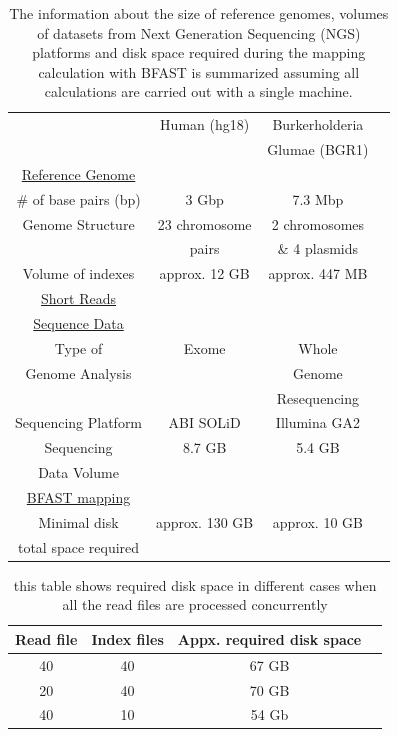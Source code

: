 \documentclass{acm_proc_article-sp}
\begin{document}
\begin{table}
\begin{tabular}{|c|c|c|c|} 
  \hline 
   & Human (hg18) & Burkerholderia   \\ 
& & Glumae (BGR1)\\   
   
   \hline
 \underline{Reference Genome}   \\
    \# of base pairs (bp) &  3 Gbp & 7.3 Mbp \\
   Genome Structure &   23 chromosome  & 2 chromosomes  \\  
   &   pairs & \& 4 plasmids \\
    Volume of indexes  & approx. 12 GB  & approx. 447 MB  \\
      \hline
    \underline{ Short Reads}   \\
        \underline{ Sequence Data}   \\
  Type of  &  Exome  & Whole \\
  
Genome Analysis  &  &  Genome \\
&& Resequencing \\
  Sequencing Platform & ABI SOLiD  &  Illumina GA2 \\
  Sequencing   & 8.7 GB & 5.4 GB \\
  Data Volume&&\\
  
  
  \hline
  \underline{ BFAST mapping}  \\
  Minimal disk &  approx. 130 GB   &    approx. 10 GB   \\
total space required & &\\
\hline
\end{tabular} \caption{The information about the size of reference genomes, volumes of datasets from Next Generation Sequencing (NGS) platforms and disk space required during the mapping calculation with BFAST is summarized assuming all calculations are carried out with a single machine.}
 \label{table:two-genomes} 
\end{table}



\begin{table}
 \begin{tabular}{|c|c|c|c|} 
 \hline 
Read file & Index files & Appx. required disk space \\
 \hline
40 &  40 & 67 GB \\
20 & 40 & 70 GB \\
40 & 10 & 54 Gb \\ 

 \hline
 \end{tabular}
 \label{table:diskspace} 
 \caption{this table shows required disk space in different cases when all the read files are processed concurrently }
\end{table}
\end{document}
